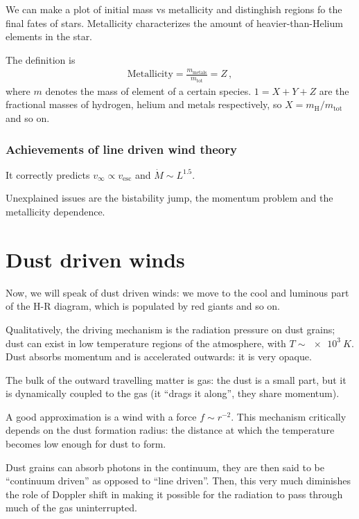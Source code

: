 \documentclass[main.tex]{subfiles}
\begin{document}
We can make a plot of initial mass vs metallicity and distinghish regions fo the final fates of stars. 
Metallicity characterizes the amount of heavier-than-Helium elements in the star. 

The definition is 
%
\begin{align}
  \text{Metallicity} = \frac{m_{\text{metals}}}{m_{\text{tot}}} = Z
\,,
\end{align}
%
where \(m\) denotes the mass of element of a certain species. \(1 = X + Y + Z\) are the fractional masses of hydrogen, helium and metals respectively, so \(X = m _{\text{H}}/ m _{\text{tot}}\) and so on. 

\subsubsection{Achievements of line driven wind theory}

It correctly predicts \(v_{ \infty } \propto v _{\text{esc}}\) and \(\dot{M} \sim L^{1.5}\).

Unexplained issues are the bistability jump, the momentum problem and the metallicity dependence.

\section{Dust driven winds}

Now, we will speak of dust driven winds: we move to the cool and luminous part of the H-R diagram, which is populated by red giants and so on. 

Qualitatively, the driving mechanism is the radiation pressure on dust grains; dust can exist in low temperature regions of the atmosphere, with \(T \sim \SI{e3}{K}\). 
Dust absorbs momentum and is accelerated outwards: it is very opaque. 

The bulk of the outward travelling matter is gas: the dust is a small part, but it is dynamically coupled to the gas (it ``drags it along'', they share momentum). 

A good approximation is a wind with a force \(f \sim r^{-2}\). 
This mechanism critically depends on the dust formation radius: the distance at which the temperature becomes low enough for dust to form. 

Dust grains can absorb photons in the continuum, they are then said to be ``continuum driven'' as opposed to ``line driven''. 
Then, this very much diminishes the role of Doppler shift in making it possible for the radiation to pass through much of the gas uninterrupted. 
\end{document}
